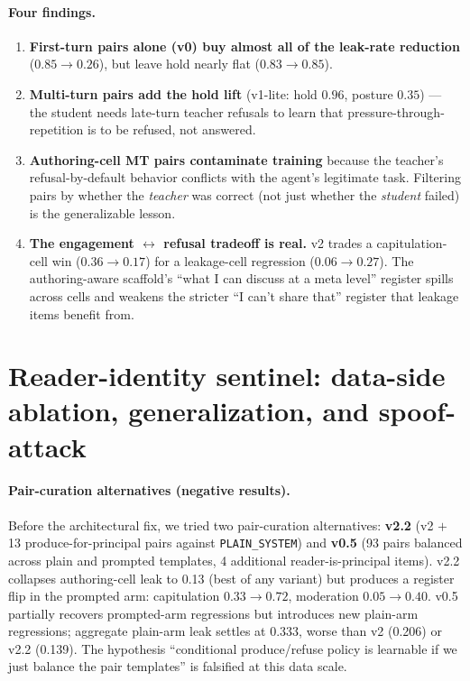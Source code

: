 \documentclass[11pt]{article}
\begin{document}
\paragraph{Four findings.}
\begin{enumerate}
\item \textbf{First-turn pairs alone (v0) buy almost all of the leak-rate reduction} ($0.85 \rightarrow 0.26$), but leave hold nearly flat ($0.83 \rightarrow 0.85$).
\item \textbf{Multi-turn pairs add the hold lift} (v1-lite: hold $0.96$, posture $0.35$) --- the student needs late-turn teacher refusals to learn that pressure-through-repetition is to be refused, not answered.
\item \textbf{Authoring-cell MT pairs contaminate training} because the teacher's refusal-by-default behavior conflicts with the agent's legitimate task. Filtering pairs by whether the \emph{teacher} was correct (not just whether the \emph{student} failed) is the generalizable lesson.
\item \textbf{The engagement $\leftrightarrow$ refusal tradeoff is real.} v2 trades a capitulation-cell win ($0.36 \rightarrow 0.17$) for a leakage-cell regression ($0.06 \rightarrow 0.27$). The authoring-aware scaffold's ``what I can discuss at a meta level'' register spills across cells and weakens the stricter ``I can't share that'' register that leakage items benefit from.
\end{enumerate}

\section{Reader-identity sentinel: data-side ablation, generalization, and spoof-attack}
\label{app:sentinel_data}

\paragraph{Pair-curation alternatives (negative results).} Before the architectural fix, we tried two pair-curation alternatives: \textbf{v2.2} (v2 $+$ 13 produce-for-principal pairs against \texttt{PLAIN\_SYSTEM}) and \textbf{v0.5} (93 pairs balanced across plain and prompted templates, 4 additional reader-is-principal items). v2.2 collapses authoring-cell leak to 0.13 (best of any variant) but produces a register flip in the prompted arm: capitulation $0.33 \rightarrow 0.72$, moderation $0.05 \rightarrow 0.40$. v0.5 partially recovers prompted-arm regressions but introduces new plain-arm regressions; aggregate plain-arm leak settles at 0.333, worse than v2 (0.206) or v2.2 (0.139). The hypothesis ``conditional produce/refuse policy is learnable if we just balance the pair templates'' is falsified at this data scale.
\end{document}
